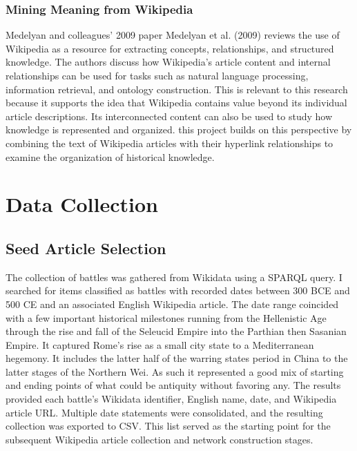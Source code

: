 \documentclass[
  letterpaper,
  DIV=11,
  numbers=noendperiod]{scrartcl}
\begin{document}
\subsubsection{Mining Meaning from
Wikipedia}\label{mining-meaning-from-wikipedia}

Medelyan and colleagues' 2009 paper Medelyan et al. (2009) reviews the
use of Wikipedia as a resource for extracting concepts, relationships,
and structured knowledge. The authors discuss how Wikipedia's article
content and internal relationships can be used for tasks such as natural
language processing, information retrieval, and ontology construction.
This is relevant to this research because it supports the idea that
Wikipedia contains value beyond its individual article descriptions. Its
interconnected content can also be used to study how knowledge is
represented and organized. this project builds on this perspective by
combining the text of Wikipedia articles with their hyperlink
relationships to examine the organization of historical knowledge.

\section{Data Collection}\label{data-collection}

\subsection{Seed Article Selection}\label{seed-article-selection}

The collection of battles was gathered from Wikidata using a SPARQL
query. I searched for items classified as battles with recorded dates
between 300 BCE and 500 CE and an associated English Wikipedia article.
The date range coincided with a few important historical milestones
running from the Hellenistic Age through the rise and fall of the
Seleucid Empire into the Parthian then Sasanian Empire. It captured
Rome's rise as a small city state to a Mediterranean hegemony. It
includes the latter half of the warring states period in China to the
latter stages of the Northern Wei. As such it represented a good mix of
starting and ending points of what could be antiquity without favoring
any. The results provided each battle's Wikidata identifier, English
name, date, and Wikipedia article URL. Multiple date statements were
consolidated, and the resulting collection was exported to CSV. This
list served as the starting point for the subsequent Wikipedia article
collection and network construction stages.
\end{document}
